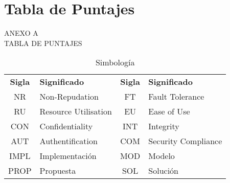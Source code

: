 
{
\Hide
\chapter{Tabla de Puntajes}
}

\begin{titular} 
	\uppercase{
	Anexo A \\
	Tabla de Puntajes \\
	}
\end{titular}

\begin{table}
\centering
\caption{Simbología}
\begin{tabularx}{\textwidth}{c | X | c | X} 
\toprule[1.5pt]
	\textbf{Sigla}	& \textbf{Significado} & \textbf{Sigla} & \textbf{Significado}	\\
	NR		&	Non-Repudation		&	FT	&	Fault Tolerance	\\
	RU		&	Resource Utilisation	&	EU	&	Ease of Use		\\
	CON		&	Confidentiality			&	INT	&	Integrity			\\
	AUT		&	Authentification		&	COM &	Security Compliance \\
	IMPL	&	Implementación		&	MOD &	Modelo			\\
	PROP	&	Propuesta			&	SOL	&	Solución			\\
					
\bottomrule[1.25pt]
\end{tabularx}
\end{table}
\bigskip

